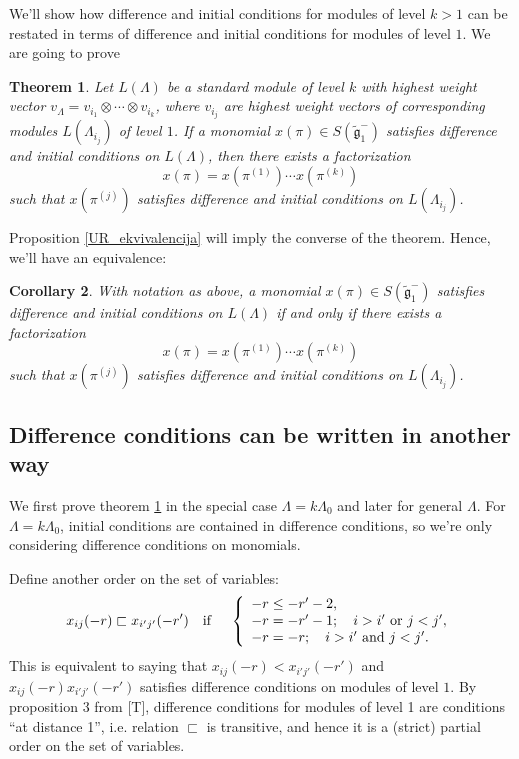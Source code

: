 \documentclass[a4paper, 10pt,oneside]{amsart}
\newtheorem{tm}{Theorem}
\newtheorem{kor}[tm]{Corollary}
\begin{document}
We'll show how difference and initial conditions for modules of level
$k>1$ can be restated in terms of difference and initial conditions for modules of level $1$.
We are going to prove
\begin{tm}
\label{URk_tm} Let $L(\Lambda)$ be a standard module of level $k$
with highest weight vector $v_\Lambda=v_{i_1}\otimes\cdots\otimes
v_{i_k}$, where $v_{i_j}$ are highest weight vectors of
corresponding modules $L(\Lambda_{i_j})$ of level $1$. If a monomial
$x(\pi)\in S({\tilde{{\mathfrak g}}}_1^-)$ satisfies difference and initial conditions
on $L(\Lambda)$, then there exists a factorization
 $$x(\pi)=x(\pi^{(1)})\cdots x(\pi^{(k)})$$
such that  $x(\pi^{(j)}) $ satisfies difference and initial
conditions on $L(\Lambda_{i_j})$.
\end{tm}

Proposition \ref{UR_ekvivalencija} will imply the converse of the
theorem. Hence, we'll have an equivalence:
\begin{kor} \label{URk_kor}
With notation as above, a monomial $x(\pi)\in S({\tilde{{\mathfrak g}}}_1^-)$ satisfies
difference and initial conditions on $L(\Lambda)$ if and only if
there exists a factorization
 $$x(\pi)=x(\pi^{(1)})\cdots x(\pi^{(k)})$$
such that  $x(\pi^{(j)}) $ satisfies difference and initial
conditions on $L(\Lambda_{i_j})$.\end{kor}

\subsection{Difference conditions can be written in another way}

We first prove theorem \ref{URk_tm} in the special case $\Lambda=k
\Lambda_0$ and later for general $\Lambda$. For $\Lambda=k
\Lambda_0$, initial conditions are contained in difference
conditions, so we're only considering difference conditions on
monomials.

Define another order on the set of variables:
\begin{equation}
\label{DCuredjaj_def}
 x_{ij}(-r) \sqsubset x_{i'j'}(-r') \textrm{\quad if \quad}
\left\{\begin{array}{l} -r \leq -r'-2,\\-r=-r'-1 ;\quad i>i'\ \textrm{or}\ j<j',\\-r=-r;\quad i>i'\ \textrm{and}\ j<j'.
\end{array}\right.
\end{equation}
This is equivalent to saying that $x_{ij}(-r) < x_{i'j'}(-r')$ and
$x_{ij}(-r) x_{i'j'}(-r')$ satisfies difference conditions on
modules of level $1$. By proposition $3$ from [T], difference
conditions for modules of level 1 are conditions ``at distance 1'', i.e. relation $\sqsubset$ is
transitive, and hence it is a (strict) partial order on the set of
variables.
\end{document}
